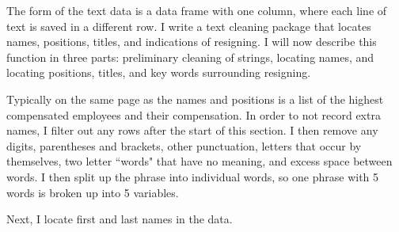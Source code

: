 \documentclass[12pt]{article}
\begin{document}
    The form of the text data is a data frame with one column, where each line of text is saved in a different row. I write a text cleaning package that locates names, positions, titles, and indications of resigning. I will now describe this function in three parts: preliminary cleaning of strings, locating names, and locating positions, titles, and key words surrounding resigning. 

    Typically on the same page as the names and positions is a list of the highest compensated employees and their compensation. In order to not record extra names, I filter out any rows after the start of this section. I then remove any digits, parentheses and brackets, other punctuation, letters that occur by themselves, two letter ``words" that have no meaning, and excess space between words. I then split up the phrase into individual words, so one phrase with 5 words is broken up into 5 variables. 

    Next, I locate first and last names in the data. 


    

    

    

    

    

    

	
	
	
\end{document}
